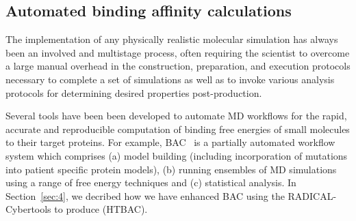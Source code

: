 
\subsection{Automated binding affinity calculations}


The implementation of any physically realistic molecular simulation has
always been an involved and multistage process, often requiring the scientist
to overcome a large manual overhead in the construction, preparation, and
execution protocols necessary to complete a set of simulations as well as to
invoke various analysis protocols for determining desired properties
post-production.

Several tools have been been developed to automate MD workflows for the
rapid, accurate and reproducible computation of binding free energies of
small molecules to their target proteins. For example, BAC~\cite{Sadiq2008}
is a partially automated workflow system which comprises (a) model building
(including incorporation of mutations into patient specific protein models),
(b) running ensembles of MD simulations using a range of free energy
techniques and (c) statistical analysis. In Section~\ref{sec:4}, we decribed
how we have enhanced BAC using the RADICAL-Cybertools to produce (HTBAC).






